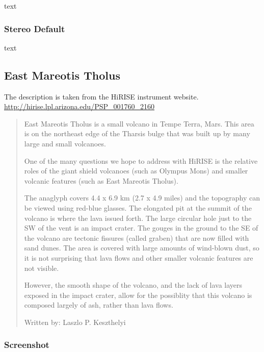 text

\subsubsection*{Stereo Default}

text

\subsection{East Mareotis Tholus}

The description is taken from the HiRISE instrument website.
\url{http://hirise.lpl.arizona.edu/PSP_001760_2160}

\begin{quotation}
East Mareotis Tholus is a small volcano in Tempe Terra, Mars. This
area is on the northeast edge of the Tharsis bulge that was built up
by many large and small volcanoes.

One of the many questions we hope to address with HiRISE is the
relative roles of the giant shield volcanoes (such as Olympus Mons)
and smaller volcanic features (such as East Mareotis Tholus).

The anaglyph covers 4.4 x 6.9 km (2.7 x 4.9 miles) and the topography
can be viewed using red-blue glasses. The elongated pit at the summit
of the volcano is where the lava issued forth. The large circular hole
just to the SW of the vent is an impact crater. The gouges in the
ground to the SE of the volcano are tectonic fissures (called graben)
that are now filled with sand dunes. The area is covered with large
amounts of wind-blown dust, so it is not surprising that lava flows
and other smaller volcanic features are not visible.

However, the smooth shape of the volcano, and the lack of lava layers
exposed in the impact crater, allow for the possiblity that this
volcano is composed largely of ash, rather than lava flows.

Written by: Laszlo P. Keszthelyi
\end{quotation}

\subsubsection*{Screenshot}

